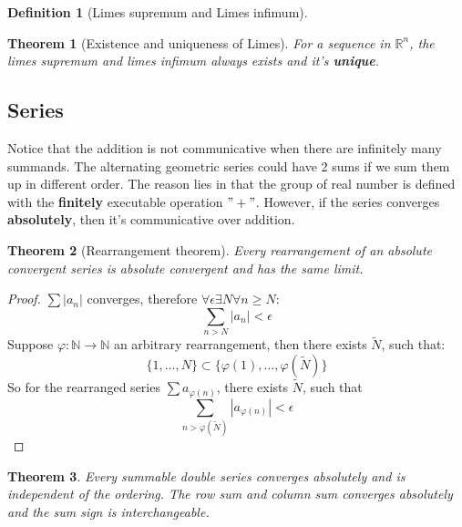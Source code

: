 \documentclass[12pt,fleqn]{book}
\newtheorem{theorem}{Theorem}[section]
\theoremstyle{definition}
\newtheorem{definition}{Definition}[section]
\begin{document}
\begin{definition}[Limes supremum and Limes infimum]
\end{definition}

\begin{theorem}[Existence and uniqueness of Limes]
For a sequence in $\mathbb{R}^n$, the limes supremum and limes infimum always exists and it's \textbf{unique}.
\end{theorem}


\subsection{Series}
Notice that the addition is not communicative when there are infinitely many summands. The alternating geometric series could have 2 sums if we sum them up in different order. The reason lies in that the group of real number is defined with the \textbf{finitely} executable operation $"+"$. However, if the series converges \textbf{absolutely}, then it's communicative over addition.

\begin{theorem}[Rearrangement theorem]
	Every rearrangement of an absolute convergent series is absolute convergent and has the same limit.
\end{theorem}
\begin{proof}
	$\sum |a_n|$ converges, therefore $\forall \epsilon \exists N \forall
	n \geq N:$
	\begin{equation*}
		\sum_{n > N} |a_n| < \epsilon
	\end{equation*}
	Suppose $\varphi: \mathbb{N} \rightarrow \mathbb{N}$ an arbitrary rearrangement, then there exists $\tilde{N}$, such that:
	\begin{equation*}
		\{1, \dots, N \} \subset \{\varphi(1), \dots, \varphi(\tilde{N})\}
	\end{equation*}
	So for the rearranged series $\sum a_{\varphi(n)}$, there exists $\tilde{N}$, such that
	\begin{equation*}
		\sum_{n > \varphi(\tilde{N})} |a_{\varphi(n)}| < \epsilon
	\end{equation*}
\end{proof}

\begin{theorem}
	Every summable double series converges absolutely and is independent of the ordering. The row sum and column sum converges absolutely and the sum sign is interchangeable.
\end{theorem}
\end{document}
